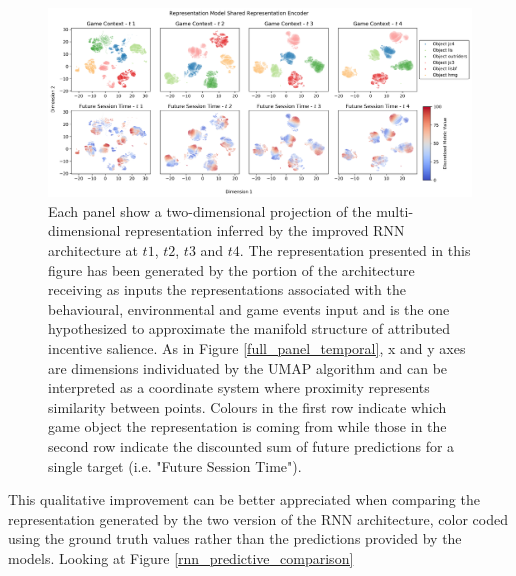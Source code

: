 \begin{figure}[ht]
\centering
\includegraphics[width=\textwidth]{images/chapter_4/RNN_env_even_0_lstm_layer_shared_Future Session Time.png}
\caption[\textbf{Lower dimensional representation of the shared latent representations generated by the improved version of the RNN architecture}]{Each panel show a two-dimensional projection of the multi-dimensional representation inferred by the improved RNN architecture at $t1$, $t2$, $t3$ and $t4$. The representation presented in this figure has been generated by the portion of the architecture receiving as inputs the representations associated with the behavioural, environmental and game events input and is the one hypothesized to approximate the manifold structure of attributed incentive salience. As in Figure \ref{full_panel_temporal}, x and y axes are dimensions individuated by the UMAP algorithm and can be interpreted as a coordinate system where proximity represents similarity between points. Colours in the first row indicate which game object the representation is coming from while those in the second row indicate the discounted sum of future predictions for a single target (i.e. "Future Session Time").}
\label{rnn_env_even_full_shared}
\end{figure}

This qualitative improvement can be better appreciated when comparing the representation generated by the two version of the RNN architecture, color coded using the ground truth values rather than the predictions provided by the models. Looking at Figure \ref{rnn_predictive_comparison}

